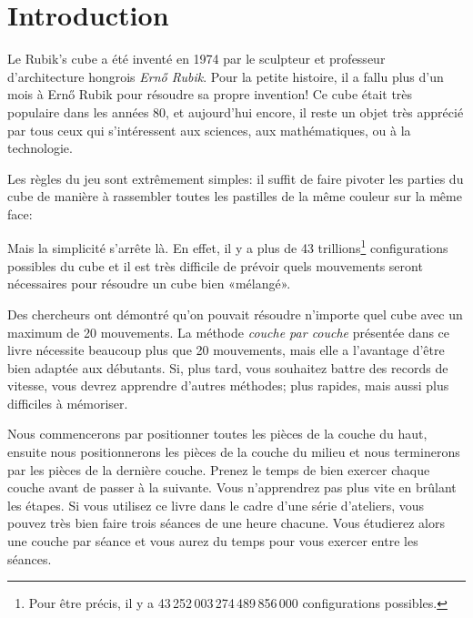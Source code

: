 \chapter{Introduction}

Le Rubik's cube a été inventé en 1974 par le sculpteur et professeur d'architecture hongrois \emph{Ernő Rubik}. Pour la petite histoire, il a fallu plus d'un mois à Ernő Rubik pour résoudre sa propre invention! Ce cube était très populaire
dans les années 80, et aujourd'hui encore, il reste un objet très apprécié
par tous ceux qui s'intéressent aux sciences, aux mathématiques, ou à la technologie.

Les règles du jeu sont extrêmement simples: il suffit de faire pivoter les parties du cube de manière à rassembler toutes les pastilles de la même couleur sur la même face:

\begin{center}
	\RubikCubeSolved
\end{center}


Mais la simplicité s'arrête là. En effet, il y a plus de 43 trillions\footnote{Pour être précis, il y a 43\,252\,003\,274\,489\,856\,000 configurations possibles.} configurations possibles du cube et il est très difficile de prévoir quels mouvements seront nécessaires pour résoudre un cube bien «mélangé».

Des chercheurs ont démontré\cite{god20} qu'on pouvait résoudre n'importe quel cube avec un maximum de 20 mouvements. La méthode \emph{couche par couche} présentée dans ce livre nécessite beaucoup plus que 20 mouvements, mais elle a l'avantage d'être bien adaptée aux débutants. Si, plus
tard, vous souhaitez battre des records de vitesse, vous devrez apprendre
d'autres méthodes; plus rapides, mais aussi plus difficiles à mémoriser.
 
Nous commencerons par positionner toutes les pièces de la couche du haut, ensuite nous positionnerons les pièces de la couche du milieu et nous terminerons par les pièces de la dernière
couche. Prenez le temps de bien exercer chaque couche avant de passer
à la suivante. Vous n'apprendrez pas plus vite en brûlant les étapes. Si vous utilisez ce livre dans le cadre d'une série d'ateliers, vous pouvez très bien faire trois
séances de une heure chacune. Vous étudierez alors une couche par séance et vous aurez du temps pour vous exercer entre les séances. 


